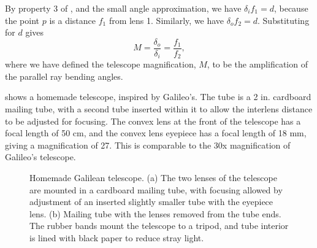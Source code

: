 By property 3 of \sect{\ref{sect:imagingWithLenses}}, and the small angle approximation, we have $\delta_i f_1 = d$, because the point $p$ is a distance $f_1$ from lens 1.  Similarly, we have $\delta_o f_2 = d$.  Substituting for $d$ gives
\begin{equation}
M = \frac{\delta_o}{\delta_i} = \frac{f_1}{f_2},
\end{equation}
where we have defined the telescope magnification, $M$, to be the amplification of the parallel ray bending angles.


\Fig{\ref{fig:homemade}} shows a homemade telescope, inspired by Galileo's.  The tube is a 2 in. cardboard mailing tube, with a second tube inserted within it to allow the interlens distance to be adjusted for focusing.  The convex lens at the front of the telescope has a focal length of 50 cm, and the convex lens eyepiece has a focal length of 18 mm, giving a magnification of 27. This is comparable to the 30x magnification of Galileo's telescope. 


\begin{figure}[t]
\centerline{
}
\caption{Homemade Galilean telescope. (a) The two lenses of the telescope are mounted in a cardboard mailing tube, with focusing allowed by adjustment of an inserted slightly smaller tube with the eyepiece lens. (b) Mailing tube with the lenses removed from the tube ends.  The rubber bands mount the telescope to a tripod, and tube interior is lined with black paper to reduce stray light.}
\label{fig:homemade}
\end{figure}

